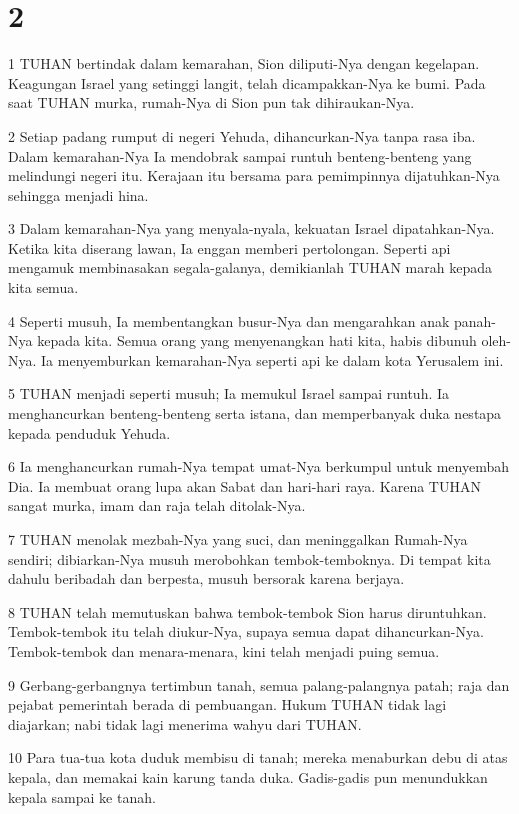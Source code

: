 \chapter{2}

\par 1 TUHAN bertindak dalam kemarahan, Sion diliputi-Nya dengan kegelapan. Keagungan Israel yang setinggi langit, telah dicampakkan-Nya ke bumi. Pada saat TUHAN murka, rumah-Nya di Sion pun tak dihiraukan-Nya.
\par 2 Setiap padang rumput di negeri Yehuda, dihancurkan-Nya tanpa rasa iba. Dalam kemarahan-Nya Ia mendobrak sampai runtuh benteng-benteng yang melindungi negeri itu. Kerajaan itu bersama para pemimpinnya dijatuhkan-Nya sehingga menjadi hina.
\par 3 Dalam kemarahan-Nya yang menyala-nyala, kekuatan Israel dipatahkan-Nya. Ketika kita diserang lawan, Ia enggan memberi pertolongan. Seperti api mengamuk membinasakan segala-galanya, demikianlah TUHAN marah kepada kita semua.
\par 4 Seperti musuh, Ia membentangkan busur-Nya dan mengarahkan anak panah-Nya kepada kita. Semua orang yang menyenangkan hati kita, habis dibunuh oleh-Nya. Ia menyemburkan kemarahan-Nya seperti api ke dalam kota Yerusalem ini.
\par 5 TUHAN menjadi seperti musuh; Ia memukul Israel sampai runtuh. Ia menghancurkan benteng-benteng serta istana, dan memperbanyak duka nestapa kepada penduduk Yehuda.
\par 6 Ia menghancurkan rumah-Nya tempat umat-Nya berkumpul untuk menyembah Dia. Ia membuat orang lupa akan Sabat dan hari-hari raya. Karena TUHAN sangat murka, imam dan raja telah ditolak-Nya.
\par 7 TUHAN menolak mezbah-Nya yang suci, dan meninggalkan Rumah-Nya sendiri; dibiarkan-Nya musuh merobohkan tembok-temboknya. Di tempat kita dahulu beribadah dan berpesta, musuh bersorak karena berjaya.
\par 8 TUHAN telah memutuskan bahwa tembok-tembok Sion harus diruntuhkan. Tembok-tembok itu telah diukur-Nya, supaya semua dapat dihancurkan-Nya. Tembok-tembok dan menara-menara, kini telah menjadi puing semua.
\par 9 Gerbang-gerbangnya tertimbun tanah, semua palang-palangnya patah; raja dan pejabat pemerintah berada di pembuangan. Hukum TUHAN tidak lagi diajarkan; nabi tidak lagi menerima wahyu dari TUHAN.
\par 10 Para tua-tua kota duduk membisu di tanah; mereka menaburkan debu di atas kepala, dan memakai kain karung tanda duka. Gadis-gadis pun menundukkan kepala sampai ke tanah.
